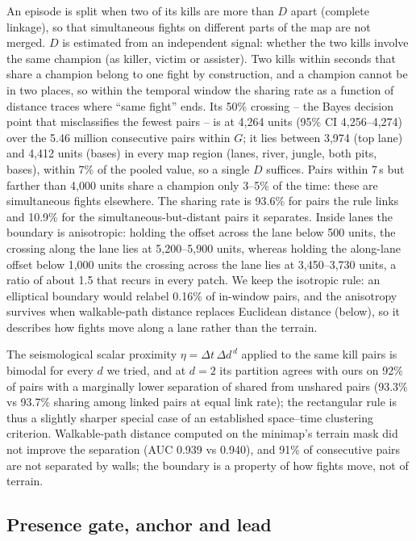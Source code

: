 An episode is split when two of its kills are more than $D$ apart (complete linkage), so
that simultaneous fights on different parts of the map are not merged. $D$ is estimated
from an independent signal: whether the two kills involve the same champion (as killer,
victim or assister). Two kills within seconds that share a champion belong to one fight
by construction, and a champion cannot be in two places, so within the temporal window
the sharing rate as a function of distance traces where ``same fight'' ends. Its 50\%
crossing -- the Bayes decision point that misclassifies the fewest pairs -- is at
4,264 units (95\% CI 4,256--4,274) over the 5.46 million consecutive pairs within $G$;
it lies between 3,974 (top lane) and 4,412 units (bases) in every map region (lanes,
river, jungle, both pits, bases), within 7\% of the pooled value, so a single $D$
suffices. Pairs within 7\,s but farther than 4,000 units share a champion only 3--5\%
of the time: these are simultaneous fights elsewhere. The sharing rate is 93.6\% for pairs
the rule links and 10.9\% for the simultaneous-but-distant pairs it separates. Inside
lanes the boundary is anisotropic: holding the offset across the lane below 500 units,
the crossing along the lane lies at 5,200--5,900 units, whereas holding the along-lane
offset below 1,000 units the crossing across the lane lies at 3,450--3,730 units, a
ratio of about 1.5 that recurs in every patch. We keep the isotropic rule: an elliptical
boundary would relabel 0.16\% of in-window pairs, and the anisotropy survives when
walkable-path distance replaces Euclidean distance (below), so it describes how fights
move along a lane rather than the terrain.

The seismological scalar proximity $\eta = \Delta t\,\Delta d^{\,d}$
\cite{zaliapin2013clusters,zaliapin2022perspectives} applied to the same kill pairs is
bimodal for every $d$ we tried, and at $d=2$ its partition agrees with ours on 92\% of
pairs with a marginally lower separation of shared from unshared pairs (93.3\% vs 93.7\%
sharing among linked pairs at equal link rate); the rectangular rule is thus a slightly
sharper special case of an established space--time clustering criterion. Walkable-path
distance computed on the minimap's terrain mask did not improve the separation
(AUC 0.939 vs 0.940), and 91\% of consecutive pairs are not separated by walls; the
boundary is a property of how fights move, not of terrain.

\subsection{Presence gate, anchor and lead}

